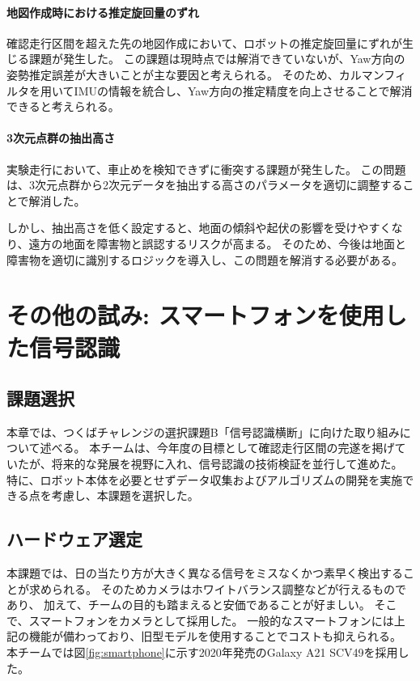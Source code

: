 \documentclass[twocolumn,9pt]{jsproceedings}
\begin{document}
\paragraph{地図作成時における推定旋回量のずれ}
確認走行区間を超えた先の地図作成において、ロボットの推定旋回量にずれが生じる課題が発生した。
この課題は現時点では解消できていないが、Yaw方向の姿勢推定誤差が大きいことが主な要因と考えられる。
そのため、カルマンフィルタを用いてIMUの情報を統合し、Yaw方向の推定精度を向上させることで解消できると考えられる。

\paragraph{3次元点群の抽出高さ}
実験走行において、車止めを検知できずに衝突する課題が発生した。
この問題は、3次元点群から2次元データを抽出する高さのパラメータを適切に調整することで解消した。

しかし、抽出高さを低く設定すると、地面の傾斜や起伏の影響を受けやすくなり、遠方の地面を障害物と誤認するリスクが高まる。
そのため、今後は地面と障害物を適切に識別するロジックを導入し、この問題を解消する必要がある。

\section{その他の試み: スマートフォンを使用した信号認識}

\subsection{課題選択}
本章では、つくばチャレンジの選択課題B「信号認識横断」に向けた取り組みについて述べる。
本チームは、今年度の目標として確認走行区間の完遂を掲げていたが、将来的な発展を視野に入れ、信号認識の技術検証を並行して進めた。
特に、ロボット本体を必要とせずデータ収集およびアルゴリズムの開発を実施できる点を考慮し、本課題を選択した。

\subsection{ハードウェア選定}
本課題では、日の当たり方が大きく異なる信号をミスなくかつ素早く検出することが求められる。
そのためカメラはホワイトバランス調整などが行えるものであり、
加えて、チームの目的も踏まえると安価であることが好ましい。
そこで、スマートフォンをカメラとして採用した。
一般的なスマートフォンには上記の機能が備わっており、旧型モデルを使用することでコストも抑えられる。
本チームでは図\ref{fig:smartphone}に示す2020年発売のGalaxy A21 SCV49を採用した。
\end{document}
